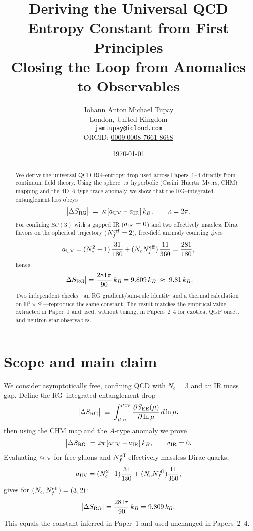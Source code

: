 \documentclass[11pt]{article}
\title{\vspace{-0.5em}\textbf{Deriving the Universal QCD Entropy Constant from First Principles}\\[0.25em]
\large Closing the Loop from Anomalies to Observables}
\author{Johann Anton Michael Tupay\\
\small London, United Kingdom\\
\small \texttt{jamtupay@icloud.com}\\
\small ORCID: \href{https://orcid.org/0009-0008-7661-8698}{0009-0008-7661-8698}}
\date{\small\today}
\begin{document}
\maketitle

\begin{abstract}
\noindent
We derive the universal QCD RG--entropy drop used across Papers~1--4 directly from continuum field theory. Using the sphere--to--hyperbolic (Casini--Huerta--Myers, CHM) mapping and the $4$D $A$-type trace anomaly, we show that the RG--integrated entanglement loss obeys
\[
\big|\Delta S_{\rm RG}\big| \;=\; \kappa\,[a_{\rm UV}-a_{\rm IR}]\,k_B,\qquad \kappa=2\pi.
\]
For confining $SU(3)$ with a gapped IR ($a_{\rm IR}=0$) and two effectively massless Dirac flavors on the spherical trajectory ($N_f^{\rm eff}=2$), free-field anomaly counting gives
\[
a_{\rm UV}=(N_c^2-1)\,\frac{31}{180} + (N_c N_f^{\rm eff})\,\frac{11}{360}=\frac{281}{180},
\]
hence
\[
\big|\Delta S_{\rm RG}\big|=\frac{281\pi}{90}\,k_B=9.809\,k_B\;\approx\;9.81\,k_B.
\]
Two independent checks---an RG gradient/sum-rule identity and a thermal calculation on $\mathbb{H}^3{\times}S^1$---reproduce the same constant. The result matches the empirical value extracted in Paper~1 and used, without tuning, in Papers~2--4 for exotica, QGP onset, and neutron-star observables.
\end{abstract}

\section{Scope and main claim}
We consider asymptotically free, confining QCD with $N_c=3$ and an IR mass gap. Define the RG--integrated entanglement drop
\begin{equation}
\big|\Delta S_{\rm RG}\big|\;\equiv\;\int_{\mu_{\rm IR}}^{\mu_{\rm UV}}\frac{\partial S_{\rm EE}(\mu)}{\partial\ln\mu}\,d\ln\mu,
\label{eq:def}
\end{equation}
then using the CHM map and the $A$-type anomaly we prove
\begin{equation}
\big|\Delta S_{\rm RG}\big| = 2\pi\,[a_{\rm UV}-a_{\rm IR}]\,k_B,\qquad a_{\rm IR}=0.
\label{eq:main}
\end{equation}
Evaluating $a_{\rm UV}$ for free gluons and $N_f^{\rm eff}$ effectively massless Dirac quarks,
\begin{equation}
a_{\rm UV}=(N_c^2{-}1)\frac{31}{180}+(N_c N_f^{\rm eff})\frac{11}{360},
\end{equation}
gives for $(N_c,N_f^{\rm eff})=(3,2)$:
\[
\big|\Delta S_{\rm RG}\big|=\frac{281\pi}{90}\,k_B=9.809\,k_B.
\]
This equals the constant inferred in Paper~1 and used unchanged in Papers~2--4.
\end{document}
